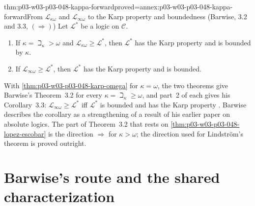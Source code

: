 \begin{hbtheorem}{thm:p03-w03-p03-048-kappa-forward}{proved=annex:p03-w03-p03-048-kappa-forward}{From \(\mathcal L_{\kappa\omega}\) and \(\mathcal L_{\infty\omega}\) to the Karp property and boundedness (Barwise, 3.2 and 3.3, \((\Rightarrow)\))}
Let \(\mathcal L^{\ast}\) be a logic on \(\mathcal C\).
\begin{enumerate}
\item If \(\kappa=\beth_\kappa>\omega\) and \(\mathcal L_{\kappa\omega}\geq
      \mathcal L^{\ast}\), then \(\mathcal L^{\ast}\) has the Karp property
      and is bounded by \(\kappa\).
\item If \(\mathcal L_{\infty\omega}\geq\mathcal L^{\ast}\), then
      \(\mathcal L^{\ast}\) has the Karp property and is bounded.
\end{enumerate}
\end{hbtheorem}

With \cref{thm:p03-w03-p03-048-karp-omega} for \(\kappa=\omega\), the two
theorems give Barwise's Theorem~3.2 for every \(\kappa=\beth_\kappa\geq
\omega\), and part~2 of each gives his Corollary~3.3: \(\mathcal
L_{\infty\omega}\geq\mathcal L^{\ast}\) iff \(\mathcal L^{\ast}\) is bounded
and has the Karp property \cite[3.3, p.~258]{Barwise1974Axioms}.  Barwise
describes the corollary as a strengthening of a result of his earlier paper
on absolute logics.  The part of Theorem~3.2 that rests on
\cref{thm:p03-w03-p03-048-lopez-escobar} is the direction \(\Rightarrow\) for
\(\kappa>\omega\); the direction used for Lindstr\"om's theorem is proved
outright.

\section{Barwise's route and the shared characterization}
\label{sec:p03-w03-p03-048-bridge}

